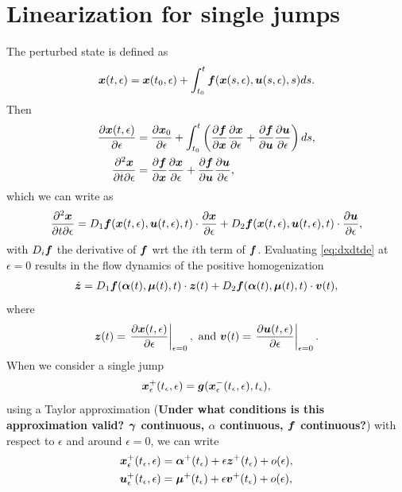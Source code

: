 \documentclass[../DC2017114Bouma.tex]{subfiles}
\begin{document}
\section{Linearization for single jumps}
The perturbed state is defined as
\begin{align}
{\boldsymbol{x}}(t,\epsilon) = {\boldsymbol{x}}(t_0,\epsilon) + \int_{t_0}^{t}{\boldsymbol{f}}({\boldsymbol{x}}(s,\epsilon),{\boldsymbol{u}}(s,\epsilon),s)ds.
\end{align}
Then
\begin{align}
\frac{\partial{\boldsymbol{x}}(t,\epsilon)}{\partial\epsilon} &= \frac{\partial{\boldsymbol{x}}_0}{\partial\epsilon} + \int_{t_0}^{t}\left(\frac{\partial{\boldsymbol{f}}}{\partial{\boldsymbol{x}}}\frac{\partial{\boldsymbol{x}}}{\partial\epsilon} + \frac{\partial{\boldsymbol{f}}}{\partial{\boldsymbol{u}}}\frac{\partial{\boldsymbol{u}}}{\partial\epsilon}\right)ds,\\
\frac{\partial^2{\boldsymbol{x}}}{\partial t\partial\epsilon} &= \frac{\partial{\boldsymbol{f}}}{\partial{\boldsymbol{x}}}\frac{\partial{\boldsymbol{x}}}{\partial\epsilon} + \frac{\partial{\boldsymbol{f}}}{\partial{\boldsymbol{u}}}\frac{\partial{\boldsymbol{u}}}{\partial\epsilon},
\end{align}
which we can write as
\begin{align}
\frac{\partial^2{\boldsymbol{x}}}{\partial t\partial\epsilon} = D_1{\boldsymbol{f}}({\boldsymbol{x}}(t,\epsilon),{\boldsymbol{u}}(t,\epsilon),t)\cdot \frac{\partial{\boldsymbol{x}}}{\partial\epsilon} + D_2{\boldsymbol{f}}({\boldsymbol{x}}(t,\epsilon),{\boldsymbol{u}}(t,\epsilon),t)\cdot \frac{\partial{\boldsymbol{u}}}{\partial\epsilon}, \label{eq:dxdtde}
\end{align}
with $D_i{\boldsymbol{f}}$ the derivative of ${\boldsymbol{f}}$ wrt the $i$th term of ${\boldsymbol{f}}$. Evaluating \eqref{eq:dxdtde} at $\epsilon = 0$ results in the flow dynamics of the positive homogenization
\begin{align}
\dot{{\boldsymbol{z}}} = D_1{\boldsymbol{f}}(\boldsymbol{\alpha}(t),\boldsymbol{\mu}(t),t)\cdot {\boldsymbol{z}}(t) + D_2{\boldsymbol{f}}(\boldsymbol{\alpha}(t),\boldsymbol{\mu}(t),t)\cdot {\boldsymbol{v}}(t),
\end{align}
where 
\begin{align}
{\boldsymbol{z}}(t) = \left.\frac{\partial{\boldsymbol{x}}(t,\epsilon)}{\partial\epsilon}\right|_{\epsilon=0},\text{ and } {\boldsymbol{v}}(t) = \left.\frac{\partial{\boldsymbol{u}}(t,\epsilon)}{\partial\epsilon}\right|_{\epsilon=0} .
\end{align}
When we consider a single jump
\begin{align}
{\boldsymbol{x}}^{+}_\epsilon(t_\epsilon,\epsilon) = {\boldsymbol{g}}({\boldsymbol{x}}^{-}_\epsilon(t_\epsilon,\epsilon),t_\epsilon),\label{eq:g}
\end{align}
using a Taylor approximation (\textbf{Under what conditions is this approximation valid? $\boldsymbol{\gamma}$ continuous, $\alpha$ continuous, ${\boldsymbol{f}}$ continuous?}) with respect to $\epsilon$ and around $\epsilon = 0$, we can write
\begin{align}
{\boldsymbol{x}}^{+}_\epsilon(t_\epsilon,\epsilon) &= \boldsymbol{\alpha}^{+}(t_\epsilon) + \epsilon {\boldsymbol{z}}^{+}(t_\epsilon) + o(\epsilon),\label{eq:xe}\\
{\boldsymbol{u}}^{+}_\epsilon(t_\epsilon,\epsilon) &= \boldsymbol{\mu}^{+}(t_\epsilon) + \epsilon {\boldsymbol{v}}^{+}(t_\epsilon) + o(\epsilon),\label{eq:ue}
\end{align}
\end{document}
